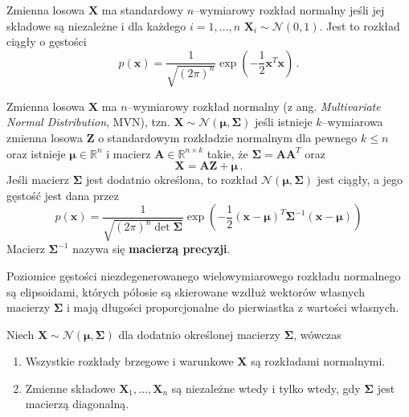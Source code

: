 \documentclass{myclass}
\numberwithin{equation}{section}
\begin{document}
\begin{definition}
Zmienna losowa \(\mathbf{X}\) ma standardowy \(n\)--wymiarowy rozkład normalny jeśli jej składowe są
niezależne i dla każdego \(i=1,\ldots,n\) \(\mathbf{X}_i \sim \mathcal{N}(0,1)\). Jest to rozkład
ciągły o gęstości
\begin{equation*}
    p(\mathbf{x}) = \frac{1}{\sqrt{(2\pi)^n}}\exp\left(-\frac{1}{2}\mathbf{x}^T\mathbf{x}\right)\,.
\end{equation*}
\end{definition}

\begin{definition}
Zmienna losowa \(\mathbf{X}\) ma \(n\)--wymiarowy rozkład normalny (z ang. \textit{Multivariate
Normal Distribution}, MVN), tzn. \(\mathbf{X} \sim \mathcal{N}(\boldsymbol{\mu},
\boldsymbol{\Sigma})\) jeśli istnieje \(k\)--wymiarowa zmienna losowa \(\mathbf{Z}\) o standardowym
rozkładzie normalnym dla pewnego \(k \leq n\) oraz istnieje \(\boldsymbol{\mu} \in \mathbb{R}^n\) i
macierz \(\mathbf{A} \in \mathbb{R}^{n \times k}\) takie, że \(\boldsymbol{\Sigma} =
\mathbf{A}\mathbf{A}^T\) oraz
\begin{equation*}
    \mathbf{X} = \mathbf{A}\mathbf{Z} + \boldsymbol{\mu}\,.
\end{equation*}
Jeśli macierz \(\boldsymbol{\Sigma}\) jest dodatnio określona, to rozkład
\(\mathcal{N}(\boldsymbol{\mu}, \boldsymbol{\Sigma})\) jest ciągły, a jego gęstość jest dana przez
\begin{equation*}
    p(\mathbf{x}) = \frac{1}{\sqrt{(2\pi)^n\det\boldsymbol{\Sigma}}}\exp\left(-\frac{1}{2}(\mathbf{x}-\boldsymbol{\mu})^T\boldsymbol{\Sigma}^{-1}(\mathbf{x}-\boldsymbol{\mu})\right)
\end{equation*}
Macierz \(\boldsymbol{\Sigma}^{-1}\) nazywa się \textbf{macierzą precyzji}.
\end{definition}

Poziomice gęstości niezdegenerowanego wielowymiarowego rozkładu normalnego są elipsoidami, których
półosie są skierowane wzdłuż wektorów własnych macierzy \(\boldsymbol{\Sigma}\) i mają długości
proporcjonalne do pierwiastka z wartości własnych.

\begin{theorem}\label{th:mvn}
Niech \(\mathbf{X} \sim \mathcal{N}(\boldsymbol{\mu}, \boldsymbol{\Sigma})\) dla dodatnio określonej
macierzy \(\boldsymbol{\Sigma}\), wówczas
\begin{enumerate}

    \item Wszystkie rozkłady brzegowe i warunkowe \(\mathbf{X}\) są rozkładami normalnymi.

    \item Zmienne składowe \(\mathbf{X}_1,\ldots,\mathbf{X}_n\) są niezależne wtedy i tylko wtedy,
    gdy \(\boldsymbol{\Sigma}\) jest macierzą diagonalną.
    
\end{enumerate}
\end{theorem}
\end{document}
